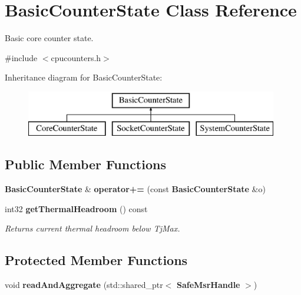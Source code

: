 \section{Basic\+Counter\+State Class Reference}
\label{classBasicCounterState}


Basic core counter state.  




{\ttfamily \#include $<$cpucounters.\+h$>$}

Inheritance diagram for Basic\+Counter\+State\+:\begin{figure}[H]
\begin{center}
\leavevmode
\includegraphics[height=2.000000cm]{classBasicCounterState}
\end{center}
\end{figure}
\subsection*{Public Member Functions}
\begin{DoxyCompactItemize}
\item 
{\bf Basic\+Counter\+State} \& {\bfseries operator+=} (const {\bf Basic\+Counter\+State} \&o)\label{classBasicCounterState_a448f898e8ff78336611db856aa1354db}

\item 
int32 {\bf get\+Thermal\+Headroom} () const \label{classBasicCounterState_a5411f6d468e66da3357a41f3c0fd1cb2}

\begin{DoxyCompactList}\small\item\em Returns current thermal headroom below Tj\+Max. \end{DoxyCompactList}\end{DoxyCompactItemize}
\subsection*{Protected Member Functions}
\begin{DoxyCompactItemize}
\item 
void {\bfseries read\+And\+Aggregate} (std\+::shared\+\_\+ptr$<$ {\bf Safe\+Msr\+Handle} $>$)\label{classBasicCounterState_ae40030f6dc67badf91e4084397f998be}

\end{DoxyCompactItemize}
